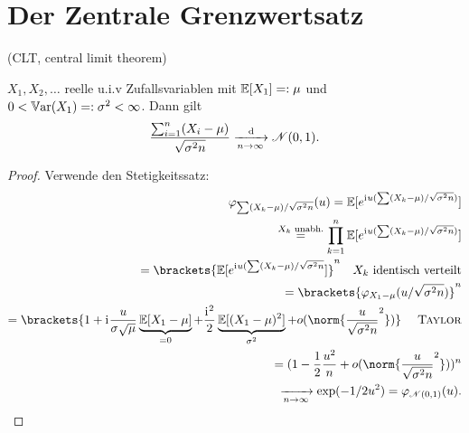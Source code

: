 \section{Der Zentrale Grenzwertsatz}
(CLT, central limit theorem)\\
\begin{proposition}
	$X_1, X_2, \dots$ reelle u.i.v Zufallsvariablen mit $\mathbb{E}[X_1] =: \mu$ und $0 <\mathbb{V}\text{ar}(X_1) =: \sigma^2 < \infty$. Dann gilt
	\begin{align*}
		\frac{\sum_{i=1}^n (X_i -\mu)}{\sqrt{\sigma^2 n}} \xrightarrow[n \to \infty]{\,\mathrm{d}} \mathscr N(0,1).
	\end{align*}
\end{proposition}
\begin{proof}
	Verwende den Stetigkeitssatz:
	\begin{align*}
		\varphi_{\sum (X_k - \mu)/\sqrt{\sigma^2 n}} (u) = \E[e^{\ii u (\sum (X_k - \mu )/\sqrt{\sigma^2n})}]\\
		\overset{X_k \text{ unabh.}}{=} \prod_{k=1}^n \E[e^{\ii u (\sum (X_k - \mu )/\sqrt{\sigma^2n})}]\\
		= \brackets{\E[e^{\ii u (\sum (X_k - \mu )/\sqrt{\sigma^2n}}]}^n\quad X_k \text{ identisch verteilt}\\
		= \brackets{\varphi_{X_1 - \mu} (u / \sqrt{\sigma^2 n})}^n\\
		= \brackets{1 + \ii \frac{u}{\sigma\sqrt{\mu}} \underbrace{\E[X_1 -\mu]}_{=0} + \frac{\ii^2}{2} \underbrace{\E[(X_1 - \mu)^2]}_{\sigma^2} + o(\norm{\frac{u}{\sqrt{\sigma^2 n}}^2})} \quad \text{ \person{Taylor}}\\
		= (1- \frac{1}{2} \frac{u^2}{n} + o(\norm{\frac{u}{\sqrt{\sigma^2 n}}^2}))^n\\
		\xrightarrow[n \to \infty]{} \exp(-1/2 u^2) = \varphi_{\normal(0,1)}(u).
	\end{align*}
\end{proof}